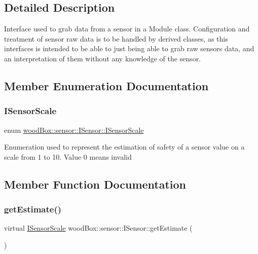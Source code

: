 \subsection{Detailed Description}
Interface used to grab data from a sensor in a Module class. Configuration and treatment of sensor raw data is to be handled by derived classes, as this interfaces is intended to be able to just being able to grab raw sensors data, and an interpretation of them without any knowledge of the sensor. 

\subsection{Member Enumeration Documentation}
\mbox{\label{classwood_box_1_1sensor_1_1_i_sensor_aa377bda61ed0d4a1d7e1a7bffe459452}} 
\subsubsection{\texorpdfstring{I\+Sensor\+Scale}{ISensorScale}}
{\footnotesize\ttfamily enum \mbox{\hyperlink{classwood_box_1_1sensor_1_1_i_sensor_aa377bda61ed0d4a1d7e1a7bffe459452}{wood\+Box\+::sensor\+::\+I\+Sensor\+::\+I\+Sensor\+Scale}}}

Enumeration used to represent the estimation of safety of a sensor value on a scale from 1 to 10. Value 0 means invalid 

\subsection{Member Function Documentation}
\mbox{\label{classwood_box_1_1sensor_1_1_i_sensor_afb01c2473efc4a823bf5dada0048d2bc}} 
\subsubsection{\texorpdfstring{get\+Estimate()}{getEstimate()}}
{\footnotesize\ttfamily virtual \mbox{\hyperlink{classwood_box_1_1sensor_1_1_i_sensor_aa377bda61ed0d4a1d7e1a7bffe459452}{I\+Sensor\+Scale}} wood\+Box\+::sensor\+::\+I\+Sensor\+::get\+Estimate (\begin{DoxyParamCaption}{ }\end{DoxyParamCaption})\hspace{0.3cm}{\ttfamily [pure virtual]}}

